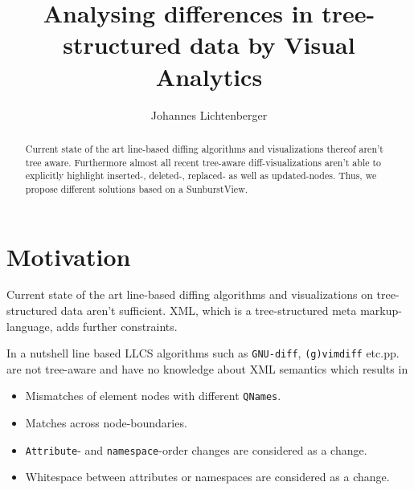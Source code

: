 \documentclass{llncs}
\begin{document}
%
\frontmatter          %
%
%
\mainmatter              %
%
\title{Analysing differences in tree-structured data
by Visual Analytics}
%
%
\author{Johannes Lichtenberger}
%

\maketitle              %

\begin{abstract}
Current state of the art line-based diffing algorithms and visualizations thereof aren't tree aware. Furthermore almost all recent tree-aware diff-visualizations aren't able to explicitly highlight inserted-, deleted-, replaced- as well as updated-nodes. Thus, we propose different solutions based on a SunburstView.
\end{abstract}
%
\section{Motivation}
Current state of the art line-based diffing algorithms and visualizations on tree-structured data aren't sufficient. XML, which is a tree-structured meta markup-language, adds further constraints.

In a nutshell line based LLCS algorithms such as \texttt{GNU-diff}, \texttt{(g)vimdiff} etc.pp. are not tree-aware and have no knowledge about XML semantics which results in

\begin{itemize}
\item Mismatches of element nodes with different \texttt{QNames}.
\item Matches across node-boundaries.
\item \texttt{Attribute}- and \texttt{namespace}-order changes are considered as a change.
\item Whitespace between attributes or namespaces are considered as a change.
\end{itemize}
\end{document}

